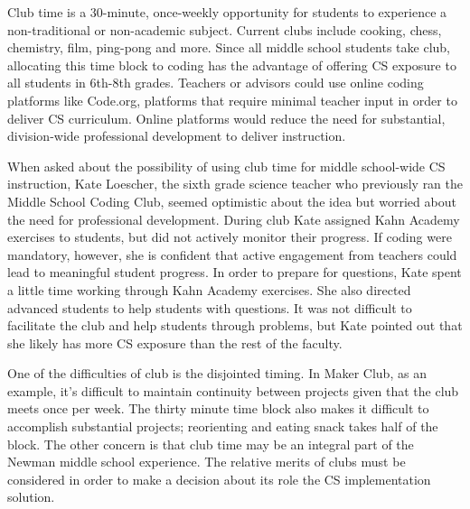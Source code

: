 Club time is a 30-minute, once-weekly opportunity for students to experience a non-traditional or non-academic subject. Current clubs include cooking, chess, chemistry, film, ping-pong and more. Since all middle school students take club, allocating this time block to coding has the advantage of offering CS exposure to all students in 6th-8th grades. Teachers or advisors could use online coding platforms like Code.org, platforms that require minimal teacher input in order to deliver CS curriculum. Online platforms would reduce the need for substantial, division-wide professional development to deliver instruction.\par 
When asked about the possibility of using club time for middle school-wide CS instruction, Kate Loescher, the sixth grade science teacher who previously ran the Middle School Coding Club, seemed optimistic about the idea but worried about the need for professional development. During club Kate assigned Kahn Academy exercises to students, but did not actively monitor their progress. If coding were mandatory, however, she is confident that active engagement from teachers could lead to meaningful student progress. In order to prepare for questions, Kate spent a little time working through Kahn Academy exercises. She also directed advanced students to help students with questions. It was not difficult to facilitate the club and help students through problems, but Kate pointed out that she likely has more CS exposure than the rest of the faculty. \par
One of the difficulties of club is the disjointed timing. In Maker Club, as an example, it's difficult to maintain continuity between projects given that the club meets once per week. The thirty minute time block also makes it difficult to accomplish substantial projects; reorienting and eating snack takes half of the block. The other concern is that club time may be an integral part of the Newman middle school experience. The relative merits of clubs must be considered in order to make a decision about its role the CS implementation solution.\par

